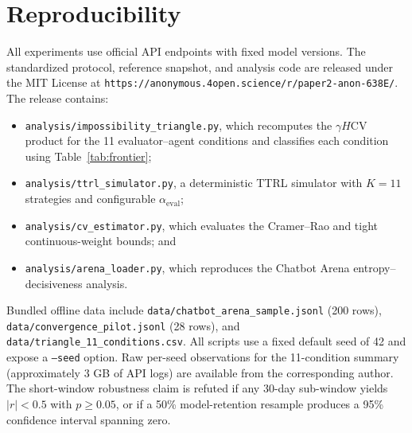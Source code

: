 \documentclass[11pt]{article}
\begin{document}
\section*{Reproducibility}

All experiments use official API endpoints with fixed model versions. The standardized protocol, reference snapshot, and analysis code are released under the MIT License at \texttt{https://anonymous.4open.science/r/paper2-anon-638E/}. The release contains:
\begin{itemize}[leftmargin=*,nosep]
  \item \texttt{analysis/impossibility\_triangle.py}, which recomputes the $\gamma H\mathrm{CV}$ product for the 11 evaluator--agent conditions and classifies each condition using Table~\ref{tab:frontier};
  \item \texttt{analysis/ttrl\_simulator.py}, a deterministic TTRL simulator with $K{=}11$ strategies and configurable $\alpha_{\text{eval}}$;
  \item \texttt{analysis/cv\_estimator.py}, which evaluates the Cramer--Rao and tight continuous-weight bounds; and
  \item \texttt{analysis/arena\_loader.py}, which reproduces the Chatbot Arena entropy--decisiveness analysis.
\end{itemize}
Bundled offline data include \texttt{data/chatbot\_arena\_sample.jsonl} (200 rows), \texttt{data/convergence\_pilot.jsonl} (28 rows), and \texttt{data/triangle\_11\_conditions.csv}. All scripts use a fixed default seed of 42 and expose a \texttt{--seed} option. Raw per-seed observations for the 11-condition summary (approximately 3 GB of API logs) are available from the corresponding author. The short-window robustness claim is refuted if any 30-day sub-window yields $|r| < 0.5$ with $p \geq 0.05$, or if a 50\% model-retention resample produces a 95\% confidence interval spanning zero.
\end{document}
